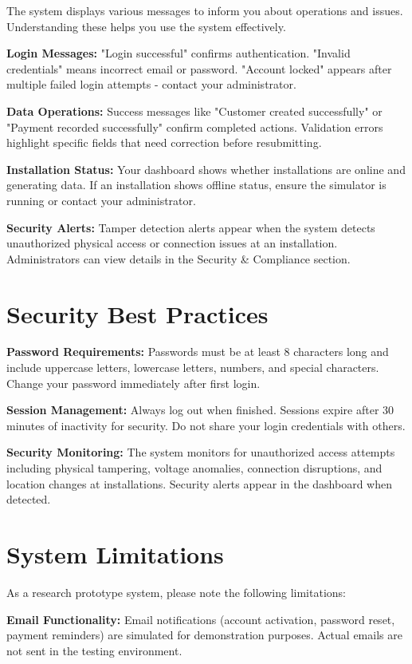 The system displays various messages to inform you about operations and issues. Understanding these helps you use the system effectively.

\textbf{Login Messages:} "Login successful" confirms authentication. "Invalid credentials" means incorrect email or password. "Account locked" appears after multiple failed login attempts - contact your administrator.

\textbf{Data Operations:} Success messages like "Customer created successfully" or "Payment recorded successfully" confirm completed actions. Validation errors highlight specific fields that need correction before resubmitting.

\textbf{Installation Status:} Your dashboard shows whether installations are online and generating data. If an installation shows offline status, ensure the simulator is running or contact your administrator.

\textbf{Security Alerts:} Tamper detection alerts appear when the system detects unauthorized physical access or connection issues at an installation. Administrators can view details in the Security & Compliance section.

\section{Security Best Practices}
\label{sec:security}

\textbf{Password Requirements:} Passwords must be at least 8 characters long and include uppercase letters, lowercase letters, numbers, and special characters. Change your password immediately after first login.

\textbf{Session Management:} Always log out when finished. Sessions expire after 30 minutes of inactivity for security. Do not share your login credentials with others.

\textbf{Security Monitoring:} The system monitors for unauthorized access attempts including physical tampering, voltage anomalies, connection disruptions, and location changes at installations. Security alerts appear in the dashboard when detected.

\section{System Limitations}
\label{sec:limitations}

As a research prototype system, please note the following limitations:

\textbf{Email Functionality:} Email notifications (account activation, password reset, payment reminders) are simulated for demonstration purposes. Actual emails are not sent in the testing environment.

